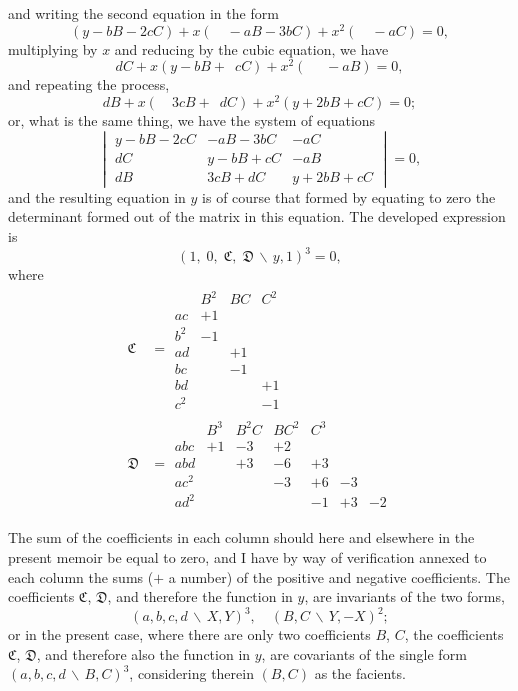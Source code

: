 \documentclass[11pt,a4paper]{book}
\begin{document}
and writing the second equation in the form
\[(y-bB-2cC) + x(\phantom{00}-aB-3bC) + x^{2}(\phantom{00}-aC) = 0,\]
multiplying by $x$ and reducing by the cubic equation, we have
\[dC + x(y-bB+\phantom{1}cC) + x^{2}(\phantom{00\,\,}-aB) = 0,\]
and repeating the process,
\[dB + x(\phantom{00}3cB+\phantom{1}dC) + x^{2}(y+2bB+cC) = 0;\]
or, what is the same thing, we have the system of equations
\[
\begin{vmatrix}
y-bB-2cC & -aB-3bC & -aC \\
dC & y-bB+cC & -aB \\
dB & 3cB+dC & y+2bB+cC
\end{vmatrix}
= 0,
\]
and the resulting equation in $y$ is of course that formed by equating to zero the
determinant formed out of the matrix in this equation. The developed expression is
\[(1,\; 0,\; \mathfrak{C},\; \mathfrak{D}\,\backslash\!\!\,y,1)^{3} = 0,\]
where
\begin{align*}
\mathfrak{C} &=
\begin{array}{c|cccc}
& B^{2} & BC & C^{2} \\
\hline
ac & +1 \\
b^{2} & -1 \\
ad & & +1 \\
bc & & -1 \\
bd & & & +1 \\
c^{2} & & & -1
\end{array}
\\[1em]
\mathfrak{D} &=
\begin{array}{c|ccccccc}
& B^{3} & B^{2}C & BC^{2} & C^{3} \\
\hline
abc & +1 & -3 & +2 \\
abd & & +3 & -6 & +3 \\
ac^{2} & & & -3 & +6 & -3 \\
ad^{2} & & & & -1 & +3 & -2
\end{array}
\end{align*}

The sum of the coefficients in each column should here and elsewhere in the present
memoir be equal to zero, and I have by way of verification annexed to each column the
sums ($+$ a number) of the positive and negative coefficients. The coefficients
$\mathfrak{C}$, $\mathfrak{D}$, and therefore the function in $y$, are invariants of the two
forms,
\[(a,b,c,d\,\backslash\!\!\,X,Y)^{3}, \quad (B,C\,\backslash\!\!\,Y,-X)^{2};\]
or in the present case, where there are only two coefficients $B$, $C$, the coefficients
$\mathfrak{C}$, $\mathfrak{D}$, and therefore also the function in $y$, are covariants of the
single form $(a,b,c,d\,\backslash\!\!\,B,C)^{3}$, considering therein $(B,C)$ as the facients.
\end{document}
